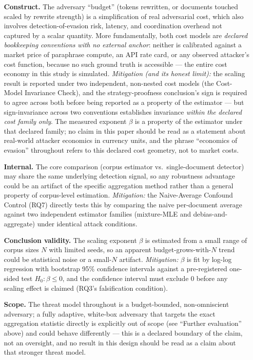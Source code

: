 \documentclass[11pt]{article}
\begin{document}
\textbf{Construct.} The adversary ``budget'' (tokens rewritten, or documents touched scaled by rewrite strength) is a simplification of real adversarial cost, which also involves detection-of-evasion risk, latency, and coordination overhead not captured by a scalar quantity. More fundamentally, both cost models are \emph{declared bookkeeping conventions with no external anchor}: neither is calibrated against a market price of paraphrase compute, an API rate card, or any observed attacker's cost function, because no such ground truth is accessible --- the entire cost economy in this study is simulated. \emph{Mitigation (and its honest limit):} the scaling result is reported under two independent, non-nested cost models (the Cost-Model Invariance Check), and the strategy-proofness conclusion's sign is required to agree across both before being reported as a property of the estimator --- but sign-invariance across two conventions establishes invariance \emph{within the declared cost family only}. The measured exponent $\beta$ is a property of the estimator under that declared family; no claim in this paper should be read as a statement about real-world attacker economics in currency units, and the phrase ``economics of evasion'' throughout refers to this declared cost geometry, not to market costs.

\textbf{Internal.} The core comparison (corpus estimator vs.\ single-document detector) may share the same underlying detection signal, so any robustness advantage could be an artifact of the specific aggregation method rather than a general property of corpus-level estimation. \emph{Mitigation:} the Naive-Average Confound Control (RQ7) directly tests this by comparing the naive per-document average against two independent estimator families (mixture-MLE and debias-and-aggregate) under identical attack conditions.

\textbf{Conclusion validity.} The scaling exponent $\beta$ is estimated from a small range of corpus sizes $N$ with limited seeds, so an apparent budget-grows-with-$N$ trend could be statistical noise or a small-$N$ artifact. \emph{Mitigation:} $\beta$ is fit by log-log regression with bootstrap 95\% confidence intervals against a pre-registered one-sided test $H_0: \beta \le 0$, and the confidence interval must exclude 0 before any scaling effect is claimed (RQ3's falsification condition).

\textbf{Scope.} The threat model throughout is a budget-bounded, non-omniscient adversary; a fully adaptive, white-box adversary that targets the exact aggregation statistic directly is explicitly out of scope (see ``Further evaluation'' above) and could behave differently --- this is a declared boundary of the claim, not an oversight, and no result in this design should be read as a claim about that stronger threat model.
\end{document}
